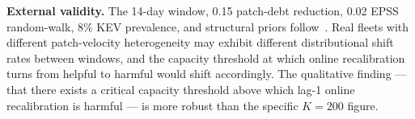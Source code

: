 \textbf{External validity.} The 14-day window, 0.15 patch-debt
reduction, 0.02 EPSS random-walk, 8\% KEV prevalence, and structural
priors follow~\cite{paper4hygieneprio,paper5temporal}. Real fleets with different patch-velocity
heterogeneity may exhibit different distributional shift rates between
windows, and the capacity threshold at which online recalibration
turns from helpful to harmful would shift accordingly. The qualitative
finding --- that there exists a critical capacity threshold above
which lag-1 online recalibration is harmful --- is more robust than
the specific $K = 200$ figure.
